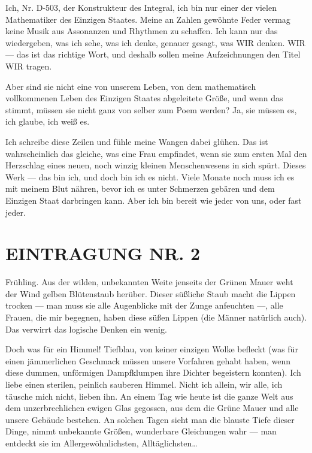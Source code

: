 Ich, Nr. D-503, der Konstrukteur des Integral, ich bin nur einer
der vielen Mathematiker des Einzigen Staates. Meine an Zahlen
gewöhnte Feder vermag keine Musik aus Assonanzen und Rhythmen zu
schaffen. Ich kann nur das wiedergeben, was ich sehe, was ich
denke, genauer gesagt, was WIR denken. WIR — das ist das richtige
Wort, und deshalb sollen meine Aufzeichnungen den Titel WIR
tragen.

Aber sind sie nicht eine von unserem Leben, von dem mathematisch
vollkommenen Leben des Einzigen Staates abgeleitete Größe, und wenn
das stimmt, müssen sie nicht ganz von selber zum Poem werden? Ja,
sie müssen es, ich glaube, ich weiß es.

Ich schreibe diese Zeilen und fühle meine Wangen dabei glühen. Das
ist wahrscheinlich das gleiche, was eine Frau empfindet, wenn sie
zum ersten Mal den Herzschlag eines neuen, noch winzig kleinen
Menschenwesens in sich spürt. Dieses Werk — das bin ich, und doch
bin ich es nicht. Viele Monate noch muss ich es mit meinem Blut
nähren, bevor ich es unter Schmerzen gebären und dem Einzigen Staat
darbringen kann. Aber ich bin bereit wie jeder von uns, oder fast
jeder.

\section{EINTRAGUNG NR. 2}

Frühling. Aus der wilden, unbekannten Weite jenseits der Grünen
Mauer weht der Wind gelben Blütenstaub herüber. Dieser süßliche
Staub macht die Lippen trocken — man muss sie alle Augenblicke mit
der Zunge anfeuchten —, alle Frauen, die mir begegnen, haben diese
süßen Lippen (die Männer natürlich auch). Das verwirrt das logische
Denken ein wenig.

Doch was für ein Himmel! Tiefblau, von keiner einzigen Wolke
befleckt (was für einen jämmerlichen Geschmack müssen unsere
Vorfahren gehabt haben, wenn diese dummen, unförmigen Dampfklumpen
ihre Dichter begeistern konnten). Ich liebe einen sterilen,
peinlich sauberen Himmel. Nicht ich allein, wir alle, ich täusche
mich nicht, lieben ihn. An einem Tag wie heute ist die ganze Welt
aus dem unzerbrechlichen ewigen Glas gegossen, aus dem die Grüne
Mauer und alle unsere Gebäude bestehen. An solchen Tagen sieht man
die blauste Tiefe dieser Dinge, nimmt unbekannte Größen, wunderbare
Gleichungen wahr — man entdeckt sie im Allergewöhnlichsten,
Alltäglichsten\ldots{}


